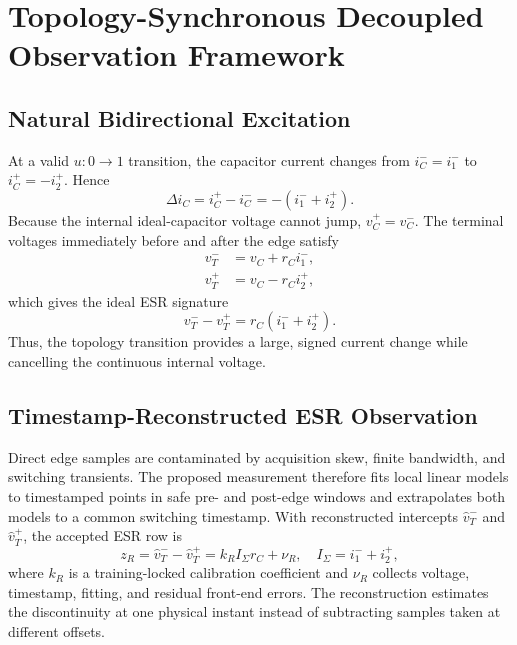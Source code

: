 \section{Topology-Synchronous Decoupled Observation Framework}
\label{sec:observations}

\subsection{Natural Bidirectional Excitation}

At a valid $u:0\rightarrow1$ transition, the capacitor current changes from $i_C^-=i_1^-$ to $i_C^+=-i_2^+$. Hence
\begin{equation}
\Delta i_C=i_C^+-i_C^-=-(i_1^-+i_2^+).
\label{eq:current_commutation}
\end{equation}
Because the internal ideal-capacitor voltage cannot jump, $v_C^+=v_C^-$. The terminal voltages immediately before and after the edge satisfy
\begin{align}
v_T^-&=v_C+r_Ci_1^-,\\
v_T^+&=v_C-r_Ci_2^+,
\end{align}
which gives the ideal ESR signature
\begin{equation}
v_T^- - v_T^+=r_C(i_1^-+i_2^+).
\label{eq:ideal_edge}
\end{equation}
Thus, the topology transition provides a large, signed current change while cancelling the continuous internal voltage.

\subsection{Timestamp-Reconstructed ESR Observation}

Direct edge samples are contaminated by acquisition skew, finite bandwidth, and switching transients. The proposed measurement therefore fits local linear models to timestamped points in safe pre- and post-edge windows and extrapolates both models to a common switching timestamp. With reconstructed intercepts $\hat v_T^-$ and $\hat v_T^+$, the accepted ESR row is
\begin{equation}
z_R=\hat v_T^- -\hat v_T^+
=k_R I_\Sigma r_C+\nu_R,
\quad I_\Sigma=i_1^-+i_2^+,
\label{eq:esr_observation}
\end{equation}
where $k_R$ is a training-locked calibration coefficient and $\nu_R$ collects voltage, timestamp, fitting, and residual front-end errors. The reconstruction estimates the discontinuity at one physical instant instead of subtracting samples taken at different offsets.

